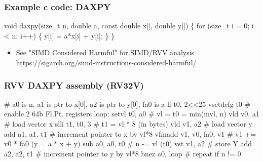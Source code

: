\documentclass[slidestop]{beamer}
\begin{document}


\begin{frame}[fragile]
\frametitle{Example c code: DAXPY}

\begin{semiverbatim}
    void daxpy(size_t n, double a,
               const double x[], double y[])
    \{
     for (size_t i = 0; i < n; i++) \{
       y[i] = a*x[i] + y[i];
     \}
    \}
\end{semiverbatim}

  \begin{itemize}
   \item See "SIMD Considered Harmful" for SIMD/RVV analysis\\
	   https://sigarch.org/simd-instructions-considered-harmful/
  \end{itemize}


\end{frame}


\begin{frame}[fragile]
\frametitle{RVV DAXPY assembly (RV32V)}

\begin{semiverbatim}
# a0 is n, a1 is ptr to x[0], a2 is ptr to y[0], fa0 is a
 li t0, 2<<25
 vsetdcfg t0            # enable 2 64b Fl.Pt. registers
loop:
 setvl  t0, a0          # vl = t0 = min(mvl, n)
 vld    v0, a1          # load vector x
 slli   t1, t0, 3       # t1 = vl * 8 (in bytes)
 vld    v1, a2          # load vector y
 add    a1, a1, t1      # increment pointer to x by vl*8
 vfmadd v1, v0, fa0, v1 # v1 += v0 * fa0 (y = a * x + y)
 sub    a0, a0, t0      # n -= vl (t0)
 vst    v1, a2          # store Y
 add    a2, a2, t1      # increment pointer to y by vl*8
 bnez   a0, loop        # repeat if n != 0
\end{semiverbatim}
\end{frame}
\end{document}
